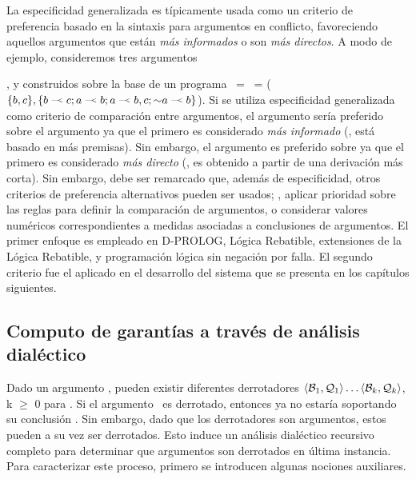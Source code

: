 La especificidad generalizada es típicamente usada como un criterio de preferencia basado en la sintaxis 
para argumentos en conflicto, favoreciendo aquellos argumentos que están \textit{más informados} o son 
\textit{más directos}. A modo de ejemplo, consideremos tres argumentos 

,  y 
construidos sobre la base de un programa \PP\ = \SD\ = ($\{b,c\},\{\drule{b}{c};\drule{a}{b};\drule{a}{b,c};\drule{\no a}{b}\}$).
Si se utiliza especificidad generalizada como criterio de comparación entre argumentos, el argumento 
 sería preferido sobre el argumento  ya que el primero es considerado \textit{más informado} (\ie, está basado en más premisas). Sin embargo, el argumento 
 es preferido sobre  ya que el primero es considerado \textit{más directo} (\ie, es obtenido a partir de una derivación más corta). Sin embargo, debe
ser remarcado que, además de especificidad, otros criterios de preferencia alternativos pueden ser usados; 
\eg, aplicar prioridad sobre las reglas para definir la comparación de argumentos, o considerar valores 
numéricos correspondientes a medidas asociadas a conclusiones de argumentos. El primer enfoque es empleado en
{\footnotesize D}-P{\footnotesize ROLOG}, Lógica Rebatible, extensiones de la Lógica Rebatible, y programación lógica sin negación por falla.
El segundo criterio fue el aplicado en el desarrollo del sistema que se presenta en los capítulos siguientes.

\subsection{Computo de garantías a través de análisis dialéctico}

Dado un argumento \AQ, pueden existir diferentes derrotadores $\mbox{$\langle \mbox{${\mathcal B_1}$},\mbox{${\mathcal Q_1}$} \rangle $}\ldots\mbox{$\langle \mbox{${\mathcal B_k}$},\mbox{${\mathcal Q_k}$} \rangle $}$, k $\ge$ 0 para
\AQ. Si el argumento \AQ\ es derrotado, entonces ya no estaría soportando su conclusión \ArgQ. 
Sin embargo, dado que los derrotadores son argumentos, estos pueden a su vez ser derrotados. Esto 
induce un análisis dialéctico recursivo completo para determinar que argumentos son derrotados en 
última instancia. Para caracterizar este proceso, primero se introducen algunas nociones auxiliares.

